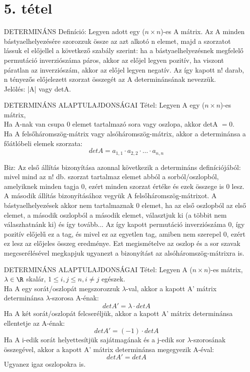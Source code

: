 \section{5. tétel}

\begin{definicio}{
DETERMINÁNS Definíció}: Legyen adott egy ($n \times n$)-es A mátrix. Az A minden bástyaelhelyezésére
szorozzuk össze az azt alkotó n elemet, majd a szorzatot lássuk el előjellel
a következő szabály szerint: ha a bástyaelhelyezésnek megfelelő permutáció inverziószáma
páros, akkor az előjel legyen pozitív, ha viszont páratlan az inverziószám,
akkor az előjel legyen negatív. Az így kapott n! darab, n tényezős előjelezett szorzat
összegét az A determinánsának nevezzük. \\
Jelölés: |A| vagy detA.
\end{definicio}
\begin{tetel}{
DETERMINÁNS ALAPTULAJDONSÁGAI Tétel}: Legyen A egy ($n \times n$)-es mátrix,\\
Ha A-nak van csupa 0 elemet tartalmazó sora vagy oszlopa, akkor detA $= 0$.\\
Ha A felsőháromszög-mátrix vagy alsóháromszög-mátrix, akkor a determinánsa a főátlóbeli elemek szorzata: $$det A = a_{1,1}\cdot a_{2,2}\cdot \ldots\cdot a_{n,n}$$
\end{tetel}
\begin{leftbar}
Biz: Az első állítás bizonyítása azonnal következik a determináns definíciójából: mivel mind az n! db. szorzat tartalmaz elemet abból a sorból/oszlopból, amelyiknek minden tagja 0, ezért minden szorzat értéke és ezek összege is 0 lesz.\\
A második állítás bizonyításához vegyük A felsőháromszög-mátrixot. A bástyaelhelyezések akkor nem tartalmaznak 0 elemet, ha az első oszlopból az első elemet, a második oszlopból a második elemet, választjuk ki (a többit nem válaszhatnánk ki) és így tovább... Az így kapott permutáció inverziószáma 0, így pozitív előjelű ez a tag, és mivel ez az egyetlen tag, amiben nem szerepel 0, ezért ez lesz az előjeles összeg eredménye. Ezt megismételve az oszlop és a sor szavak megcserélésével megkapjuk ugyanezt a bizonyítást az alsóháromszög-mátrixra is.
\end{leftbar}
\begin{tetel}{
DETERMINÁNS ALAPTULAJDONSÁGAI Tétel}: Legyen A ($n\times n$)-es mátrix, $\lambda \in \R$ skalár, $1 \leq i,j\leq n, i \neq j$ egészek.\\
Ha A egy sorát/oszlopát megszorozzuk $\lambda$-val, akkor a kapott A' mátrix determinánsa $\lambda$-szorosa A-énak:$$detA' = \lambda\cdot detA$$
Ha A két sorát/oszlopát felcseréljük, akkor a kapott A' mátrix determinánsa ellentetje az A-énak:
$$detA' = (-1)\cdot detA$$
Ha A i-edik sorát helyettesítjük sajátmagának és a j-edik sor $\lambda$-szorosának összegével, akkor a kapott A' mátrix determinánsa megegyezik A-éval:
$$detA' = detA$$ Ugyanez igaz oszlopokra is.
\end{tetel}
